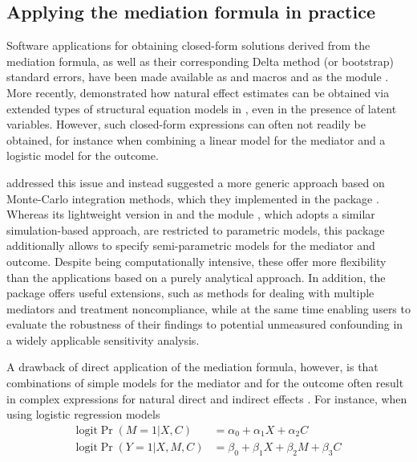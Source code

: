\documentclass[nojss]{jss}
\begin{document}
\subsection{Applying the mediation formula in practice}
Software applications for obtaining closed-form solutions derived from the mediation formula, as well as their corresponding Delta method (or bootstrap) standard errors, have been made available as  and  macros \citep{Valeri2013} and as the  module  \citep{Emsley2013}. 
More recently, \cite{Muthen2014} demonstrated how natural effect estimates can be obtained via extended types of structural equation models in , even in the presence of latent variables. However, such closed-form expressions can often not readily be obtained, for instance when combining a linear model for the mediator and a logistic model for the outcome.
\par \cite{Imai2010a} addressed this issue and instead suggested a more generic approach based on Monte-Carlo integration methods, which they implemented in the  package  \citep{R:mediation}.
Whereas its lightweight version in  \citep{Hicks2011} and the  module  \citep{Daniel2011}, which adopts a similar simulation-based approach, are restricted to parametric models, this  package additionally allows to specify semi-parametric models for the mediator and outcome. Despite being computationally intensive, these offer more flexibility than the applications based on a purely analytical approach. In addition, the  package offers useful extensions, such as methods for dealing with multiple mediators and treatment noncompliance, while at the same time enabling users to evaluate the robustness of their findings to potential unmeasured confounding in a widely applicable sensitivity analysis.
\par A drawback of direct application of the mediation formula, however, is that combinations of simple models for the mediator and for the outcome often result in complex expressions for natural direct and indirect effects \citep{Lange2012,Vansteelandt2012}. For instance, when using logistic regression models 
\begin{align}
\mbox{logit} \Pr(M=1\vert X,C) &= \alpha_0 + \alpha_1 X + \alpha_2 C\nonumber\\
\mbox{logit} \Pr(Y=1\vert X,M,C) &= \beta_0 + \beta_1 X + \beta_2 M + \beta_3 C \tag{0}\label{0}
\end{align}
\end{document}
